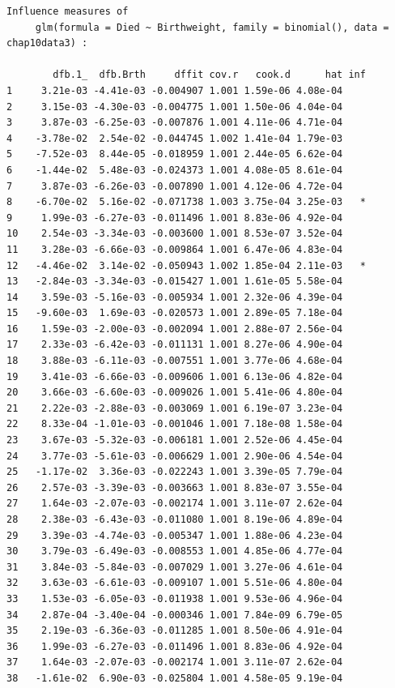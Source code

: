 \documentclass[
  letterpaper,
  DIV=11,
  numbers=noendperiod]{scrartcl}
\begin{document}
\begin{verbatim}
Influence measures of
     glm(formula = Died ~ Birthweight, family = binomial(), data = chap10data3) :

        dfb.1_  dfb.Brth     dffit cov.r   cook.d      hat inf
1     3.21e-03 -4.41e-03 -0.004907 1.001 1.59e-06 4.08e-04    
2     3.15e-03 -4.30e-03 -0.004775 1.001 1.50e-06 4.04e-04    
3     3.87e-03 -6.25e-03 -0.007876 1.001 4.11e-06 4.71e-04    
4    -3.78e-02  2.54e-02 -0.044745 1.002 1.41e-04 1.79e-03    
5    -7.52e-03  8.44e-05 -0.018959 1.001 2.44e-05 6.62e-04    
6    -1.44e-02  5.48e-03 -0.024373 1.001 4.08e-05 8.61e-04    
7     3.87e-03 -6.26e-03 -0.007890 1.001 4.12e-06 4.72e-04    
8    -6.70e-02  5.16e-02 -0.071738 1.003 3.75e-04 3.25e-03   *
9     1.99e-03 -6.27e-03 -0.011496 1.001 8.83e-06 4.92e-04    
10    2.54e-03 -3.34e-03 -0.003600 1.001 8.53e-07 3.52e-04    
11    3.28e-03 -6.66e-03 -0.009864 1.001 6.47e-06 4.83e-04    
12   -4.46e-02  3.14e-02 -0.050943 1.002 1.85e-04 2.11e-03   *
13   -2.84e-03 -3.34e-03 -0.015427 1.001 1.61e-05 5.58e-04    
14    3.59e-03 -5.16e-03 -0.005934 1.001 2.32e-06 4.39e-04    
15   -9.60e-03  1.69e-03 -0.020573 1.001 2.89e-05 7.18e-04    
16    1.59e-03 -2.00e-03 -0.002094 1.001 2.88e-07 2.56e-04    
17    2.33e-03 -6.42e-03 -0.011131 1.001 8.27e-06 4.90e-04    
18    3.88e-03 -6.11e-03 -0.007551 1.001 3.77e-06 4.68e-04    
19    3.41e-03 -6.66e-03 -0.009606 1.001 6.13e-06 4.82e-04    
20    3.66e-03 -6.60e-03 -0.009026 1.001 5.41e-06 4.80e-04    
21    2.22e-03 -2.88e-03 -0.003069 1.001 6.19e-07 3.23e-04    
22    8.33e-04 -1.01e-03 -0.001046 1.001 7.18e-08 1.58e-04    
23    3.67e-03 -5.32e-03 -0.006181 1.001 2.52e-06 4.45e-04    
24    3.77e-03 -5.61e-03 -0.006629 1.001 2.90e-06 4.54e-04    
25   -1.17e-02  3.36e-03 -0.022243 1.001 3.39e-05 7.79e-04    
26    2.57e-03 -3.39e-03 -0.003663 1.001 8.83e-07 3.55e-04    
27    1.64e-03 -2.07e-03 -0.002174 1.001 3.11e-07 2.62e-04    
28    2.38e-03 -6.43e-03 -0.011080 1.001 8.19e-06 4.89e-04    
29    3.39e-03 -4.74e-03 -0.005347 1.001 1.88e-06 4.23e-04    
30    3.79e-03 -6.49e-03 -0.008553 1.001 4.85e-06 4.77e-04    
31    3.84e-03 -5.84e-03 -0.007029 1.001 3.27e-06 4.61e-04    
32    3.63e-03 -6.61e-03 -0.009107 1.001 5.51e-06 4.80e-04    
33    1.53e-03 -6.05e-03 -0.011938 1.001 9.53e-06 4.96e-04    
34    2.87e-04 -3.40e-04 -0.000346 1.001 7.84e-09 6.79e-05    
35    2.19e-03 -6.36e-03 -0.011285 1.001 8.50e-06 4.91e-04    
36    1.99e-03 -6.27e-03 -0.011496 1.001 8.83e-06 4.92e-04    
37    1.64e-03 -2.07e-03 -0.002174 1.001 3.11e-07 2.62e-04    
38   -1.61e-02  6.90e-03 -0.025804 1.001 4.58e-05 9.19e-04    

\end{verbatim}
\end{document}
